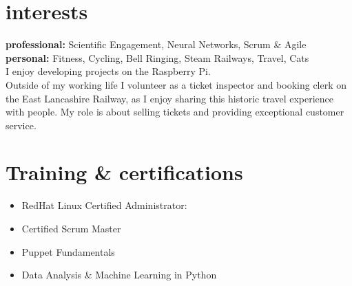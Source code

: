 \documentclass[]{cv-style}          %
\begin{document}
\section{interests}
  \vspace{-0.2cm}

\textbf{professional:} Scientific Engagement, Neural Networks, Scrum \& Agile\\

\textbf{personal:} Fitness, Cycling, Bell Ringing, Steam Railways, Travel, Cats\\
I enjoy developing projects on the Raspberry Pi.\\
Outside of my working life I volunteer as a ticket inspector and booking clerk on the East Lancashire Railway, as I enjoy sharing this historic travel experience with people. My role is about selling tickets and providing exceptional customer service.

\section{Training \& certifications}
  \vspace{-0.2cm}
\begin{itemize}
\item{RedHat Linux Certified Administrator:}\\
\item{Certified Scrum Master}\\
\item{Puppet Fundamentals}\\
\item{Data Analysis \& Machine Learning in Python}\\
\end{itemize}


\end{document}
